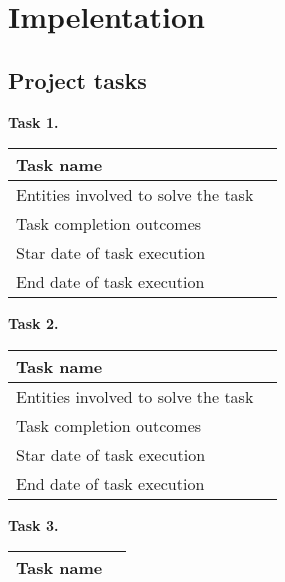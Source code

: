 \chapter{Impelentation}\label{ch:impelentation}


\section{Project tasks}\label{sec:project-tasks}
\begin{description}
    \item \hspace*{8mm}\textbf{Task 1.}\\
    \begin{tabular}{|p{}|p{}|}
        \hline
        Task name                           & \\
        \hline
        Entities involved to solve the task & \\
        \hline
        Task completion outcomes            & \\
        \hline
        Star date of task execution         & \\
        \hline
        End date of task execution          & \\
        \hline
    \end{tabular}
    \item \hspace*{8mm}\textbf{Task 2.}\\
    \begin{tabular}{|p{}|p{}|}
        \hline
        Task name                           & \\
        \hline
        Entities involved to solve the task & \\
        \hline
        Task completion outcomes            & \\
        \hline
        Star date of task execution         & \\
        \hline
        End date of task execution          & \\
        \hline
    \end{tabular}
    \item \hspace*{8mm}\textbf{Task 3.}\\
    \begin{tabular}{|p{}|p{}|}
        \hline
        Task name                           & \\
        \hline

\end{tabular}
\end{description}
